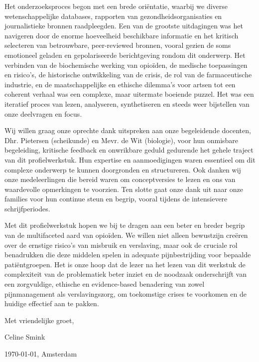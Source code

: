 \documentclass[11pt, a4paper]{report} %
\begin{document}
Het onderzoeksproces begon met een brede oriëntatie, waarbij we diverse wetenschappelijke databases, rapporten van gezondheidsorganisaties en journalistieke bronnen raadpleegden. Een van de grootste uitdagingen was het navigeren door de enorme hoeveelheid beschikbare informatie en het kritisch selecteren van betrouwbare, peer-reviewed bronnen, vooral gezien de soms emotioneel geladen en gepolariseerde berichtgeving rondom dit onderwerp. Het verbinden van de biochemische werking van opioïden, de medische toepassingen en risico's, de historische ontwikkeling van de crisis, de rol van de farmaceutische industrie, en de maatschappelijke en ethische dilemma's voor artsen tot een coherent verhaal was een complexe, maar uitermate boeiende puzzel. Het was een iteratief proces van lezen, analyseren, synthetiseren en steeds weer bijstellen van onze deelvragen en focus.

Wij willen graag onze oprechte dank uitspreken aan onze begeleidende docenten, Dhr. Pietersen (scheikunde) en Mevr. de Wit (biologie), voor hun onmisbare begeleiding, kritische feedback en onwrikbare geduld gedurende het gehele traject van dit profielwerkstuk. Hun expertise en aanmoedigingen waren essentieel om dit complexe onderwerp te kunnen doorgronden en structureren. Ook danken wij onze medeleerlingen die bereid waren om conceptversies te lezen en ons van waardevolle opmerkingen te voorzien. Ten slotte gaat onze dank uit naar onze families voor hun continue steun en begrip, vooral tijdens de intensievere schrijfperiodes.

Met dit profielwerkstuk hopen we bij te dragen aan een beter en breder begrip van de multifaceted aard van opioïden. We willen niet alleen bewustzijn creëren over de ernstige risico's van misbruik en verslaving, maar ook de cruciale rol benadrukken die deze middelen spelen in adequate pijnbestrijding voor bepaalde patiëntgroepen. Het is onze hoop dat de lezer na het lezen van dit werkstuk de complexiteit van de problematiek beter inziet en de noodzaak onderschrijft van een zorgvuldige, ethische en evidence-based benadering van zowel pijnmanagement als verslavingszorg, om toekomstige crises te voorkomen en de huidige effectief aan te pakken.

Met vriendelijke groet,

Celine Smink

\today, Amsterdam %


\tableofcontents
\cleardoublepage %
\end{document}
